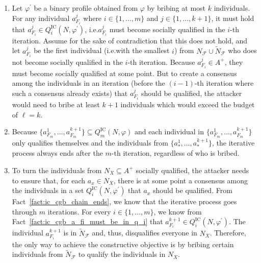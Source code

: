 \documentclass[
    12pt,               %
    a4paper,            %
    bibtotoc,           %
    pointlessnumbers,   %
    ngerman,            %
    titlepage,          %
    leqno,              %
    ]{scrarticle}       %
\newcommand\factref{Fact~\ref}
\begin{document}
\begin{Proof}
\begin{enumerate}[
    topsep=-4pt,
    leftmargin=*,
    itemindent=4.96em,
    label={\textit{Fact \ref*{thm:ic_cgb_npc}.\arabic*}:},
    ref={\ref*{thm:ic_cgb_npc}.\arabic*}
]
\item \label{fact:ic_cgb_a_fi_must_be_in_q_i}
Let $\varphi^\prime$ be a binary profile obtained from $\varphi$ by bribing at most $k$ individuals. For any individual $a^j_{F_i}$ where $i \in \{ 1, \ldots, m \}$ and $j \in \{ 1, \ldots, k+1 \}$, it must hold that $a^j_{F_i} \in Q^{\text{IC}}_i(N, \varphi^\prime)$, i.e.\@ $a^j_{F_i}$ must become socially qualified in the $i$-th iteration. Assume for the sake of contradiction that this does not hold, and let $a^j_{F_i}$ be the first individual (i.e.\@ with the smallest $i$) from $N_\mathcal{F} \cup \tilde{N}_\mathcal{F}$ who does not become socially qualified in the $i$-th iteration. Because $a^j_{F_i} \in A^+$, they must become socially qualified at some point. But to create a consensus among the individuals in an iteration (before the $(i-1)$-th iteration where such a consensus already exists) that $a^j_{F_i}$ should be qualified, the attacker would need to bribe at least $k+1$ individuals which would exceed the budget of $\ell = k$.

\item \label{fact:ic_cgb_chain_ends}
Because $\{ a^1_{F_m}, \ldots, a^{k+1}_{F_m} \} \subseteq Q^{\text{IC}}_m(N, \varphi)$ and each individual in $\{ a^1_{F_m}, \ldots, a^{k+1}_{F_m} \}$ only qualifies themselves and the individuals from $\{ a^1_\ast, \ldots, a^{k+1}_\ast \}$, the iterative process always ends after the $m$-th iteration, regardless of who is bribed.

\item \label{fact:ic_cgb_must_bribe_in_n_f}
To turn the individuals from $N_X \subseteq A^+$ socially qualified, the attacker needs to ensure that, for each $a_x \in N_X$, there is at some point a consensus among the individuals in a set $Q^{\text{IC}}_i(N, \varphi^\prime)$ that $a_x$ should be qualified. From \factref{fact:ic_cgb_chain_ends}, we know that the iterative process goes through $m$ iterations. For every $i \in \{ 1, \ldots, m \}$, we know from \factref{fact:ic_cgb_a_fi_must_be_in_q_i} that $a^{k+1}_{F_i} \in Q^{\text{IC}}_i(N, \varphi^\prime)$. The individual $a^{k+1}_{F_i}$ is in $\tilde{N}_\mathcal{F}$ and, thus, disqualifies everyone in $N_X$. Therefore, the only way to achieve the constructive objective is by bribing certain individuals from $\tilde{N}_\mathcal{F}$ to qualify the individuals in $N_X$.


\end{enumerate}
\end{Proof}
\end{document}
